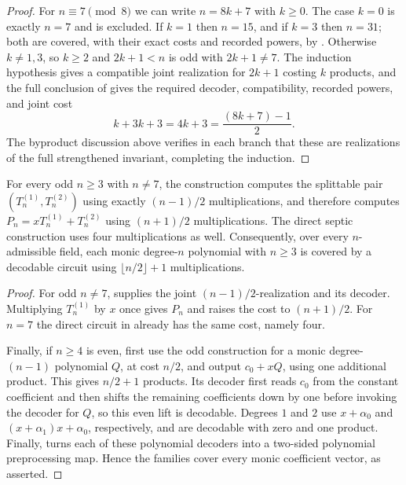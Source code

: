 \begin{proof}
    For $n\equiv 7\pmod 8$ we can write $n=8k+7$ with $k\ge 0$.
    The case $k=0$ is exactly $n=7$ and is excluded.
    If $k=1$ then $n=15$, and if $k=3$ then $n=31$; both are covered, with
    their exact costs and recorded powers, by
    .  Otherwise $k\ne1,3$, so $k\ge2$
    and $2k+1<n$ is odd with $2k+1\ne7$.  The induction hypothesis gives a
    compatible joint realization for $2k+1$ costing $k$ products, and
    the full conclusion of  gives the required
    decoder, compatibility, recorded powers, and joint cost
    \[
       k+3k+3=4k+3=\frac{(8k+7)-1}{2}.
    \]
    The byproduct discussion above verifies in each branch that these are
    realizations of the full strengthened invariant, completing the induction.
\end{proof}

\begin{theorem}\label{thm:construction-count}
    For every odd $n\ge3$ with $n\ne7$, the construction computes the
    splittable pair $(T^{(1)}_n,T^{(2)}_n)$ using exactly $(n-1)/2$
    multiplications, and therefore computes
    $P_n=xT^{(1)}_n+T^{(2)}_n$ using $(n+1)/2$ multiplications.  The direct
    septic construction uses four multiplications as well.  Consequently, over
    every $n$-admissible field, each monic degree-$n$ polynomial with $n\ge3$
    is covered by a decodable circuit using
    $\lfloor n/2\rfloor+1$ multiplications.
\end{theorem}
\begin{proof}
    For odd $n\ne7$,  supplies the joint
    $(n-1)/2$-realization and its decoder.  Multiplying $T^{(1)}_n$ by $x$
    once gives $P_n$ and raises the cost to $(n+1)/2$.  For $n=7$ the direct
    circuit in  already has the same cost, namely four.

    Finally, if $n\ge4$ is even, first use the odd construction for a monic
    degree-$(n-1)$ polynomial $Q$, at cost $n/2$, and output
    $c_0+xQ$, using one additional product.  This gives $n/2+1$ products.
    Its decoder first reads $c_0$ from the constant coefficient and then
    shifts the remaining coefficients down by one before invoking the decoder
    for $Q$, so this even lift is decodable.  Degrees $1$ and $2$ use
    $x+\alpha_0$ and $(x+\alpha_1)x+\alpha_0$, respectively, and are
    decodable with zero and one product.  Finally,
     turns each of these
    polynomial decoders into a two-sided polynomial preprocessing map.
    Hence the families cover every monic coefficient vector, as asserted.
\end{proof}

